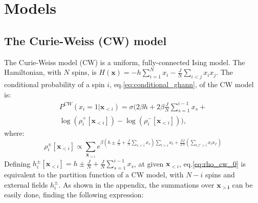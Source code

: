 \documentclass[aps,physrev,10pt,floatfix,reprint]{revtex4-2}
\begin{document}
\section{Models}
\subsection{The Curie-Weiss (CW) model}

The Curie-Weiss model (CW) is a uniform, fully-connected Ising model. The Hamiltonian, with $N$ spins, is $H\left(\mathbf{x}\right)=-h\sum_{i=1}^{N}x_{i}-\frac{J}{N}\sum_{i<j}x_{i}x_{j}$. The conditional probability of a spin $i$, eq.\ref{eq:conditional_ghann}, of the CW model is:
\begin{multline}
P^{CW}\left(x_{i}=1|\mathbf{x}_{<i}\right) = 
\sigma\bigg( 
 2 \beta h + 2 \beta \frac{J}{N}\sum_{s=1}^{i-1}x_{s} + \\
 \log(\rho_i^+[\mathbf{x}_{<i}]) - \log(\rho_i^-[\mathbf{x}_{<i}])
\bigg),
\label{eq:conditional_cw}
\end{multline}
where:
\begin{equation}
\rho_i^{\pm}[\mathbf{x}_{<i}] \propto \sum_{\mathbf{x}_{>i}}e^{\beta \left(h\pm\frac{J}{N}+\frac{J}{N}\sum_{s<i}x_{s}\right)\sum_{l>i}x_{l}+\frac{\beta J}{2N}(\sum_{l,l'>i}x_{l} x_{l'})} 
\label{eq:rho_cw_0}
\end{equation}
Defining $h_i^{\pm}[\mathbf{x}_{<i}] =h\pm\frac{J}{N}+\frac{J}{N}\sum_{s=1}^{i-1}x_{s}$, at given $\mathbf{x}_{<i}$, eq.\ref{eq:rho_cw_0} is equivalent to the partition function of a CW model, with $N-i$ spins and external fields $h_i^{\pm}$. 
As shown in the appendix, the summations over $\mathbf{x_{>i}}$ can be easily done, finding the following expression:
\end{document}
